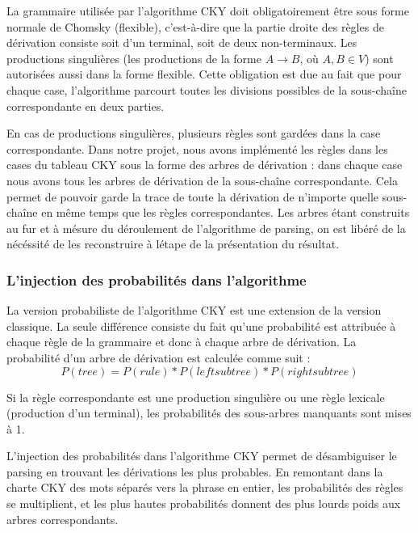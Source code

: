 \documentclass[12pt]{article}
\begin{document}
La grammaire utilis\'ee par l'algorithme CKY doit obligatoirement \^etre sous forme
normale de Chomsky (flexible), c'est-\`a-dire que la partie droite des r\`egles de
d\'erivation consiste soit d'un terminal, soit de deux non-terminaux. Les productions
singuli\`eres (les productions de la forme $A \rightarrow B$, o\`u $A,B \in V$) sont
autoris\'ees aussi dans la forme flexible. Cette obligation est
due au fait que pour chaque case, l'algorithme parcourt toutes les divisions possibles de la sous-cha\^ine
correspondante en deux parties. \par

En cas de productions singuli\`eres, plusieurs r\`egles sont gard\'ees dans la case
correspondante. Dans notre projet, nous avons impl\'ement\'e les r\`egles dans les
cases du tableau CKY sous la forme des arbres de d\'erivation : dans chaque case
nous avons tous les arbres de d\'erivation de la sous-cha\^ine correspondante. Cela
permet de pouvoir garde la trace de toute la d\'erivation de n'importe quelle
sous-cha\^ine en m\^eme temps que les r\`egles correspondantes. Les arbres \'etant construits
au fur et \`a m\'esure du d\'eroulement de l'algorithme de parsing, on est lib\'er\'e de la n\'ec\'essit\'e
de les reconstruire \`a l\'etape de la pr\'esentation du r\'esultat.

\subsubsection{L'injection des probabilit\'es dans l'algorithme}

La version probabiliste de l'algorithme CKY est une extension de la version
classique. La seule diff\'erence consiste du fait qu'une probabilit\'e est attribu\'ee
\`a chaque r\`egle de la grammaire et donc \`a chaque arbre de d\'erivation. La
probabilit\'e d'un arbre de d\'erivation est calcul\'ee comme suit :
$$P(tree) = P(rule) * P(left subtree) * P(right subtree)$$

Si la r\`egle correspondante est une production singuli\`ere ou une r\`egle lexicale
(production d'un terminal), les probabilit\'es des sous-arbres manquants sont mises
\`a 1. \par

L'injection des probabilit\'es dans l'algorithme CKY permet de d\'esambiguiser le
parsing en trouvant les d\'erivations les plus probables. En remontant dans la
charte CKY des mots s\'epar\'es vers la phrase en entier, les probabilit\'es des
r\`egles se multiplient, et les plus hautes probabilit\'es donnent des plus lourds
poids aux arbres correspondants. \par
\end{document}
